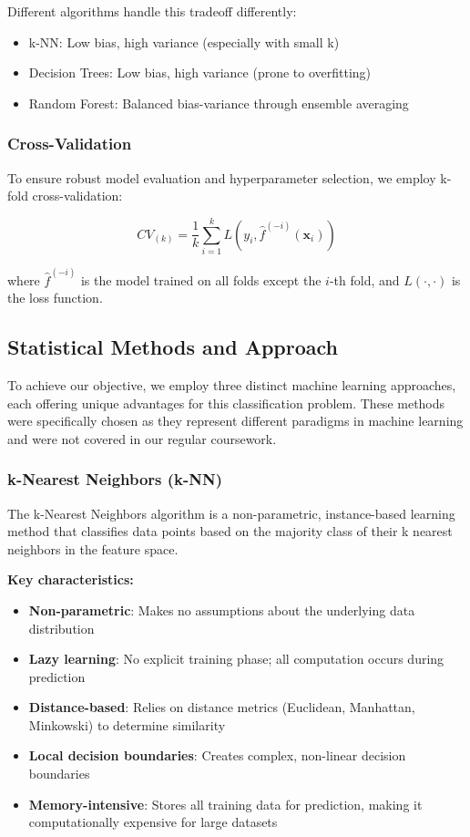 Different algorithms handle this tradeoff differently:
\begin{itemize}
    \item k-NN: Low bias, high variance (especially with small k)
    \item Decision Trees: Low bias, high variance (prone to overfitting)
    \item Random Forest: Balanced bias-variance through ensemble averaging
\end{itemize}

\subsubsection{Cross-Validation}
To ensure robust model evaluation and hyperparameter selection, we employ k-fold cross-validation:

\begin{equation}
CV_{(k)} = \frac{1}{k} \sum_{i=1}^{k} L(y_i, \hat{f}^{(-i)}(\mathbf{x}_i))
\end{equation}

where $\hat{f}^{(-i)}$ is the model trained on all folds except the $i$-th fold, and $L(\cdot, \cdot)$ is the loss function.

\subsection{Statistical Methods and Approach}
To achieve our objective, we employ three distinct machine learning approaches, each offering unique advantages for this classification problem. These methods were specifically chosen as they represent different paradigms in machine learning and were not covered in our regular coursework.

\subsubsection{k-Nearest Neighbors (k-NN)}
The k-Nearest Neighbors algorithm is a non-parametric, instance-based learning method that classifies data points based on the majority class of their k nearest neighbors in the feature space.

\textbf{Key characteristics:}
\begin{itemize}
    \item \textbf{Non-parametric}: Makes no assumptions about the underlying data distribution \cite{cover1967nearest}
    \item \textbf{Lazy learning}: No explicit training phase; all computation occurs during prediction
    \item \textbf{Distance-based}: Relies on distance metrics (Euclidean, Manhattan, Minkowski) to determine similarity
    \item \textbf{Local decision boundaries}: Creates complex, non-linear decision boundaries
    \item \textbf{Memory-intensive}: Stores all training data for prediction, making it computationally expensive for large datasets
\end{itemize}

